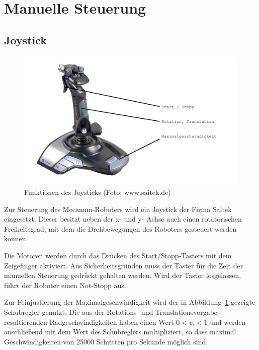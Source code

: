 
\section{Manuelle Steuerung}

\subsection{Joystick}
\begin{figure}
\centering
    \includegraphics[width=.8\textwidth]{Abbildungen/Joystick}
    \caption[Funktionen des Joysticks]{Funktionen des Joysticks (Foto: www.saitek.de)}
    \label{fig:Joystick}
\end{figure}
Zur Steuerung des Mecanum-Roboters wird ein Joystick der Firma Saitek eingesetzt.
Dieser besitzt neben der x- und y- Achse auch einen rotatorischen Freiheitsgrad, mit dem die Drehbewegungen des Roboters gesteuert werden können.

Die Motoren werden durch das Drücken des Start/Stopp-Tasters mit dem Zeigefinger aktiviert. Aus Sicherheitsgründen muss der Taster für die Zeit der manuellen Steuerung gedrückt gehalten werden. Wird der Taster losgelassen, führt der Roboter einen Not-Stopp aus.

Zur Feinjustierung der Maximalgeschwindigkeit wird der in Abbildung~\ref{fig:Joystick} gezeigte Schubregler genutzt. Die aus der Rotations- und Translationsvorgabe resultierenden Radgeschwindigkeiten haben einen Wert $0 < v_i < 1$ und werden anschließend mit dem Wert des Schubreglers multipliziert, so dass maximal Geschwindigkeiten von 25000 Schritten pro Sekunde möglich sind.

